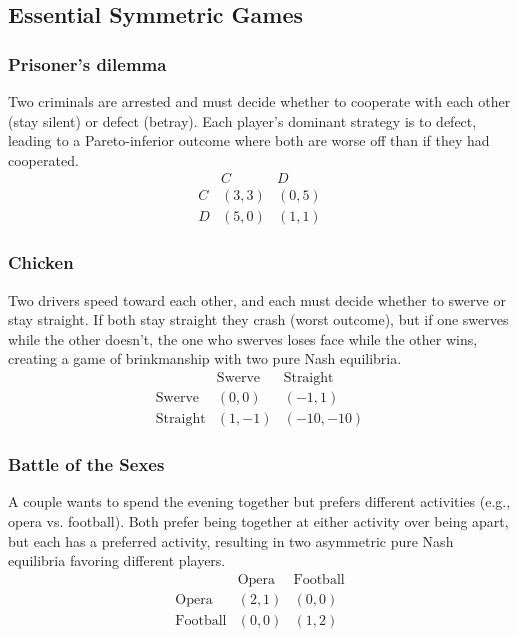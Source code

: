 \documentclass[11pt]{amsart}
\begin{document}
\subsection{Essential Symmetric Games}

\subsubsection{Prisoner's dilemma}

Two criminals are arrested and must decide whether to cooperate with each other (stay silent) or defect (betray). Each player's dominant strategy is to defect, leading to a Pareto-inferior outcome where both are worse off than if they had cooperated.
\[
\begin{array}{c|c|c}
  & C & D \\
\hline
C & (3, 3) & (0, 5) \\
\hline
D & (5, 0) & (1, 1)
\end{array}
\]

\subsubsection{Chicken}

Two drivers speed toward each other, and each must decide whether to swerve or stay straight. If both stay straight they crash (worst outcome), but if one swerves while the other doesn't, the one who swerves loses face while the other wins, creating a game of brinkmanship with two pure Nash equilibria.
\[
\begin{array}{c|c|c}
  & \text{Swerve} & \text{Straight} \\
\hline
\text{Swerve} & (0, 0) & (-1, 1) \\
\hline
\text{Straight} & (1, -1) & (-10, -10)
\end{array}
\]

\subsubsection{Battle of the Sexes}

A couple wants to spend the evening together but prefers different activities (e.g., opera vs. football). Both prefer being together at either activity over being apart, but each has a preferred activity, resulting in two asymmetric pure Nash equilibria favoring different players.
\[
\begin{array}{c|c|c}
  & \text{Opera} & \text{Football} \\
\hline
\text{Opera} & (2, 1) & (0, 0) \\
\hline
\text{Football} & (0, 0) & (1, 2)
\end{array}
\]
\end{document}
